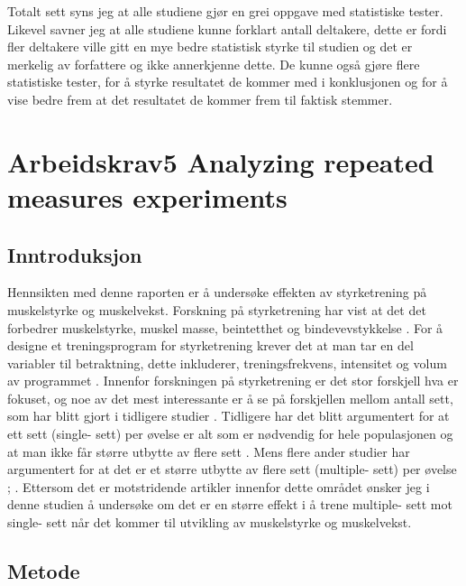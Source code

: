 \documentclass[
]{book}
\begin{document}
Totalt sett syns jeg at alle studiene gjør en grei oppgave med statistiske tester. Likevel savner jeg at alle studiene kunne forklart antall deltakere, dette er fordi fler deltakere ville gitt en mye bedre statistisk styrke til studien og det er merkelig av forfattere og ikke annerkjenne dette. De kunne også gjøre flere statistiske tester, for å styrke resultatet de kommer med i konklusjonen og for å vise bedre frem at det resultatet de kommer frem til faktisk stemmer.

\hypertarget{arbeidskrav5-analyzing-repeated-measures-experiments}{%
\chapter{Arbeidskrav5 Analyzing repeated measures experiments}\label{arbeidskrav5-analyzing-repeated-measures-experiments}}

\hypertarget{inntroduksjon-1}{%
\section{Inntroduksjon}\label{inntroduksjon-1}}

Hennsikten med denne raporten er å undersøke effekten av styrketrening på muskelstyrke og muskelvekst.
Forskning på styrketrening har vist at det det forbedrer muskelstyrke, muskel masse, beintetthet og bindevevstykkelse \citep{kraemer2002a}. For å designe et treningsprogram for styrketrening krever det at man tar en del variabler til betraktning, dette inkluderer, treningsfrekvens, intensitet og volum av programmet \citep{hass2001a}. Innenfor forskningen på styrketrening er det stor forskjell hva er fokuset, og noe av det mest interessante er å se på forskjellen mellom antall sett, som har blitt gjort i tidligere studier \citep{krieger2010a}. Tidligere har det blitt argumentert for at ett sett (single- sett) per øvelse er alt som er nødvendig for hele populasjonen og at man ikke får større utbytte av flere sett \citep{carpinelli1998c}. Mens flere ander studier har argumentert for at det er et større utbytte av flere sett (multiple- sett) per øvelse \citet{galvão2005a}; \citet{humburg2007e}. Ettersom det er motstridende artikler innenfor dette området ønsker jeg i denne studien å undersøke om det er en større effekt i å trene multiple- sett mot single- sett når det kommer til utvikling av muskelstyrke og muskelvekst.

\hypertarget{metode-2}{%
\section{Metode}\label{metode-2}}
\end{document}
